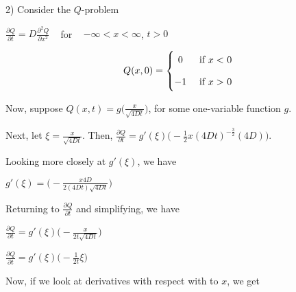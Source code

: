 \documentclass[executivepaper]{article}
\begin{document}
\begin{flushleft}

2) Consider the $Q$-problem

\begin{center}

$\frac{\partial Q}{\partial t}=D \frac{\partial^2 Q}{\partial x^2}$ {~} for {~} $-\infty < x < \infty$,  $t > 0$

\vspace{3mm}

\[
 Q(x,0)=
  \begin{cases} 
      \hfill 0    \hfill & \text{ if $x <$ 0} \\[2ex]
      \hfill -1 \hfill & \text{ if $x >$ 0} \\
  \end{cases}
\]

\vspace{3mm}

Now, suppose $Q(x,t)=g \bigg(\frac{x}{\sqrt{4Dt}}\bigg)$, for some one-variable function $g$.

\vspace{2mm}

Next, let $\xi=\frac{x}{\sqrt{4Dt}}$. Then, $\frac{\partial Q}{\partial t}=g'(\xi)\bigg(-\frac{1}{2}x(4Dt)^{-\frac{3}{2}}(4D)\bigg)$.

\vspace{2mm}

Looking more closely at $g'(\xi)$, we have

\vspace{2mm}

$g'(\xi)=\bigg(-\frac{x4D}{2(4Dt) \sqrt{4Dt}}\bigg)$

\vspace{2mm}

Returning to $\frac{\partial Q}{\partial t}$ and simplifying, we have

\pagebreak

\vspace*{-40mm}

$\frac{\partial Q}{\partial t}=g'(\xi)\bigg(-\frac{x}{2t \sqrt{4Dt}}\bigg)$

\vspace{2mm}

$\frac{\partial Q}{\partial t}=g'(\xi)\bigg(-\frac{1}{2t} \xi \bigg)$

\vspace{5mm}

Now, if we look at derivatives with respect with to $x$, we get

\vspace{3mm}


\end{center}
\end{flushleft}
\end{document}
